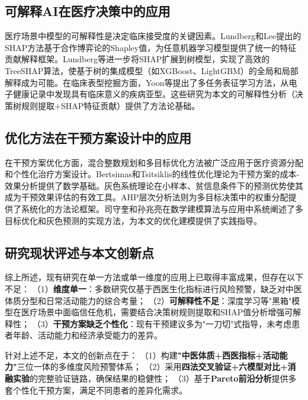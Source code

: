 \documentclass[12pt,a4paper]{ctexart}
\begin{document}
\subsection{可解释AI在医疗决策中的应用}

医疗场景中模型的可解释性是决定临床接受度的关键因素。Lundberg和Lee\cite{ref15}提出的SHAP方法基于合作博弈论的Shapley值，为任意机器学习模型提供了统一的特征贡献解释框架。Lundberg等\cite{ref21}进一步将SHAP扩展到树模型，实现了高效的TreeSHAP算法，使基于树的集成模型（如XGBoost、LightGBM）的全局和局部解释成为可能。在临床表型挖掘方面，Yoon等\cite{ref20}提出了多任务表征学习方法，从电子健康记录中发现具有临床意义的疾病亚型。这些研究为本文的可解释性分析（决策树规则提取+SHAP特征贡献）提供了方法论基础。

\subsection{优化方法在干预方案设计中的应用}

在干预方案优化方面，混合整数规划和多目标优化方法被广泛应用于医疗资源分配和个性化治疗方案设计。Bertsimas和Tsitsiklis\cite{ref23}的线性优化理论为干预方案的成本-效果分析提供了数学基础。灰色系统理论\cite{ref12}在小样本、贫信息条件下的预测优势使其成为干预效果评估的有效工具。AHP层次分析法\cite{ref13}则为多目标决策中的权重分配提供了系统化的方法论框架。司守奎和孙兆亮\cite{ref25}在数学建模算法与应用中系统阐述了多目标优化和灰色预测的实现方法，为本文的优化建模提供了实践指导。

\subsection{研究现状评述与本文创新点}

综上所述，现有研究在单一方法或单一维度的应用上已取得丰富成果，但存在以下不足：
（1）\textbf{维度单一}：多数研究仅基于西医生化指标进行风险预警\cite{ref18,ref19}，缺乏对中医体质分型和日常活动能力的综合考量；
（2）\textbf{可解释性不足}：深度学习等"黑箱"模型在医疗场景中面临信任危机\cite{ref21}，需要结合决策树规则提取和SHAP值分析增强可解释性；
（3）\textbf{干预方案缺乏个性化}：现有干预建议多为"一刀切"式指导，未考虑患者年龄、活动能力和经济承受能力的差异。

针对上述不足，本文的创新点在于：
（1）构建\textbf{"中医体质+西医指标+活动能力"}三位一体的多维度风险预警体系；
（2）采用\textbf{四法交叉验证+六模型对比+消融实验}的完整验证链路，确保结果的稳健性；
（3）基于\textbf{Pareto前沿分析}提供多套个性化干预方案，满足不同患者的差异化需求。

\end{document}
